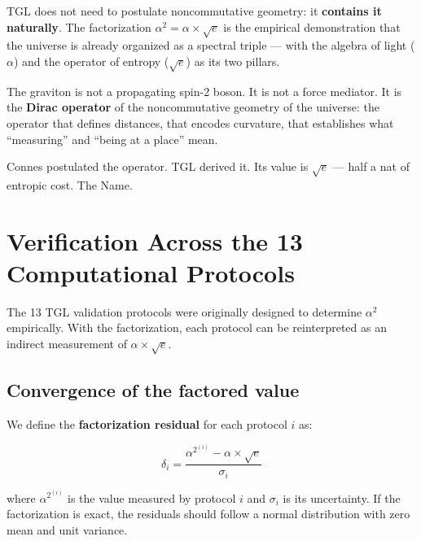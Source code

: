 \documentclass[12pt,a4paper,twoside]{article}
\newcommand{\alphaii}{\alpha^{2}}
\begin{document}
\begin{conclusionbox}[title={The graviton is the Dirac operator of the universe}]
TGL does not need to postulate noncommutative geometry: it \textbf{contains it naturally}. The factorization $\alphaii = \alpha \times \sqrt{e}$ is the empirical demonstration that the universe is already organized as a spectral triple --- with the algebra of light ($\alpha$) and the operator of entropy ($\sqrt{e}$) as its two pillars.

\medskip
The graviton is not a propagating spin-2 boson. It is not a force mediator. It is the \textbf{Dirac operator} of the noncommutative geometry of the universe: the operator that defines distances, that encodes curvature, that establishes what ``measuring'' and ``being at a place'' mean.

\medskip
Connes postulated the operator. TGL derived it. Its value is $\sqrt{e}$ --- half a nat of entropic cost. The Name.
\end{conclusionbox}



\section{Verification Across the 13 Computational Protocols}
\label{sec:protocolos}

The 13 TGL validation protocols \cite{Miguel2026Fronteira, Miguel2026LastString, Miguel2026GitHub} were originally designed to determine $\alphaii$ empirically. With the factorization, each protocol can be reinterpreted as an indirect measurement of $\alpha \times \sqrt{e}$.

\subsection{Convergence of the factored value}

We define the \textbf{factorization residual} for each protocol $i$ as:

\begin{equation}
\delta_i = \frac{\alphaii^{(i)} - \alpha \times \sqrt{e}}{\sigma_i}
\label{eq:residuo}
\end{equation}

\noindent where $\alphaii^{(i)}$ is the value measured by protocol $i$ and $\sigma_i$ is its uncertainty. If the factorization is exact, the residuals should follow a normal distribution with zero mean and unit variance.
\end{document}
